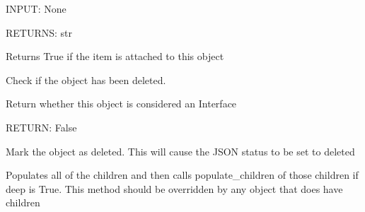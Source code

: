 \documentclass[letterpaper,10pt,english]{sphinxmanual}
\begin{document}
\begin{fulllineitems}
\begin{fulllineitems}
INPUT: None

RETURNS: str

\end{fulllineitems}


\begin{fulllineitems}
\label{acibaseobject:acibaseobject.BaseACIObject.is_attached}
Returns True if the item is attached to this object

\end{fulllineitems}


\begin{fulllineitems}
\label{acibaseobject:acibaseobject.BaseACIObject.is_deleted}
Check if the object has been deleted.

\end{fulllineitems}


\begin{fulllineitems}
\label{acibaseobject:acibaseobject.BaseACIObject.is_interface}
Return whether this object is considered an Interface

RETURN: False

\end{fulllineitems}


\begin{fulllineitems}
\label{acibaseobject:acibaseobject.BaseACIObject.mark_as_deleted}
Mark the object as deleted.  This will cause the JSON status
to be set to deleted

\end{fulllineitems}


\begin{fulllineitems}
\label{acibaseobject:acibaseobject.BaseACIObject.populate_children}
Populates all of the children and then calls populate\_children
of those children if deep is True.  This method should be
overridden by any object that does have children


\end{fulllineitems}
\end{fulllineitems}
\end{document}

